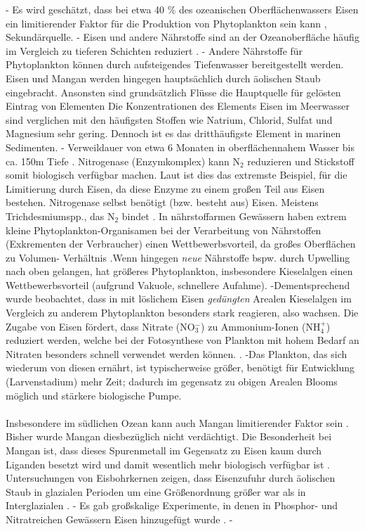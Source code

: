 \documentclass[12pt,a4paper,onecolumn]{scrartcl}
\begin{document}
- Es wird geschätzt, dass bei etwa 40 \% des ozeanischen Oberflächenwassers Eisen ein limitierender Faktor für die Produktion von Phytoplankton sein kann \citep{Emerson.2009}, Sekundärquelle. - Eisen und andere Nährstoffe sind an der Ozeanoberfläche häufig im Vergleich zu tieferen Schichten reduziert \citep{Martin.1990}. - Andere Nährstoffe für Phytoplankton können durch aufsteigendes Tiefenwasser bereitgestellt werden. Eisen und Mangan werden hingegen hauptsächlich durch äolischen Staub eingebracht. Ansonsten sind grundsätzlich Flüsse die Hauptquelle für gelösten Eintrag von Elementen \citep{Emerson.2009} Die Konzentrationen des Elements Eisen im Meerwasser sind verglichen mit den häufigsten Stoffen wie Natrium, Chlorid, Sulfat und Magnesium sehr gering. Dennoch ist es das dritthäufigste Element in marinen Sedimenten. \citep{Emerson.2009} - Verweildauer von etwa 6 Monaten in oberflächennahem Wasser bis ca. 150m Tiefe \citep{Hayes.2015}. Nitrogenase (Enzymkomplex) kann N$_2$ reduzieren und Stickstoff somit biologisch verfügbar machen. Laut \citet{Emerson.2009} ist dies das extremste Beispiel, für die Limitierung durch Eisen, da diese Enzyme zu einem großen Teil aus Eisen bestehen. Nitrogenase selbst benötigt (bzw. besteht aus) Eisen. Meistens Trichdesmiumspp., das N$_2$ bindet \citep{Falkowski.1998}.  In nährstoffarmen Gewässern haben extrem kleine Phytoplankton-Organisamen bei der Verarbeitung von Nährstoffen (Exkrementen der Verbraucher) einen Wettbewerbsvorteil, da großes Oberflächen zu Volumen- Verhältnis \citep{Falkowski.1998}.Wenn hingegen \textit{neue} Nährstoffe bspw. durch Upwelling nach oben gelangen, hat größeres Phytoplankton, insbesondere Kieselalgen einen Wettbewerbsvorteil (aufgrund Vakuole, schnellere Aufahme). -Dementsprechend wurde beobachtet, dass in mit löslichem Eisen \textit{gedüngten} Arealen  Kieselalgen im Vergleich zu anderem Phytoplankton besonders stark reagieren, also wachsen. Die Zugabe von Eisen fördert, dass Nitrate (NO$_3^-$) zu Ammonium-Ionen (NH$_4^+$) reduziert werden, welche bei der Fotosynthese von Plankton mit hohem Bedarf an Nitraten besonders schnell verwendet werden können.  \citep{Emerson.2009}. -Das Plankton, das sich wiederum von diesen ernährt, ist typischerweise größer, benötigt für Entwicklung (Larvenstadium) mehr Zeit; dadurch im gegensatz zu obigen Arealen Blooms möglich und stärkere biologische Pumpe.
\\\\ Insbesondere im südlichen Ozean kann auch Mangan limitierender Faktor sein \citep{Browning.2021}. Bisher wurde Mangan diesbezüglich nicht verdächtigt. Die Besonderheit bei Mangan ist, dass dieses Spurenmetall im Gegensatz zu Eisen kaum durch Liganden besetzt wird und damit wesentlich mehr biologisch verfügbar ist \citep{Emerson.2009}. Untersuchungen von Eisbohrkernen zeigen, dass Eisenzufuhr durch äolischen Staub in glazialen Perioden um eine Größenordnung größer war als in Interglazialen \citep{Falkowski.1998}. - Es gab großskalige Experimente, in denen in Phosphor- und Nitratreichen Gewässern Eisen hinzugefügt wurde \citep{Emerson.2009}. -
\end{document}
